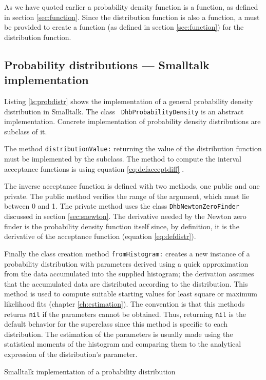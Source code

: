 \documentclass[twoside]{book}
\begin{document}
As we have quoted earlier a probability density function is a
function, as defined in section \ref{sec:function}. Since the
distribution function is also a function, a 
must be provided to create a function (as defined in section
\ref{sec:function}) for the distribution function.

\subsection{Probability distributions --- Smalltalk implementation}
Listing \ref{ls:probdistr} shows the implementation of a general
probability density distribution in Smalltalk. The class {\tt
DhbProbabilityDensity} is an abstract implementation. Concrete
implementation of probability density distributions are subclass
of it.

The method {\tt distributionValue:} returning the value of the
distribution function must be implemented by the subclass. The
method to compute the interval acceptance functions is using
equation \ref{eq:defacceptdiff} .

The inverse acceptance function is defined with two methods, one
public and one private. The public method verifies the range of
the argument, which must lie between 0 and 1. The private method
uses the class {\tt DhbNewtonZeroFinder} discussed in section
\ref{sec:snewton}. The derivative needed by the Newton zero finder
is the probability density function itself since, by definition,
it is the derivative of the acceptance function (\cf equation
\ref{eq:defdistr}).

Finally the class creation method {\tt fromHistogram:} creates a
new instance of a probability distribution with parameters derived
using a quick approximation from the data accumulated into the
supplied histogram; the derivation assumes that the accumulated
data are distributed according to the distribution. This method is
used to compute suitable starting values for least square or
maximum likelihood fits (\cf chapter \ref{ch:estimation}). The
convention is that this methods returns {\tt nil} if the
parameters cannot be obtained. Thus, returning {\tt nil} is the
default behavior for the superclass since this method is specific
to each distribution. The estimation of the parameters is usually
made using the statistical moments of the histogram and comparing
them to the analytical expression of the distribution's parameter.

\begin{listing} Smalltalk implementation of a probability distribution
\label{ls:probdistr}

\end{listing}
\end{document}
